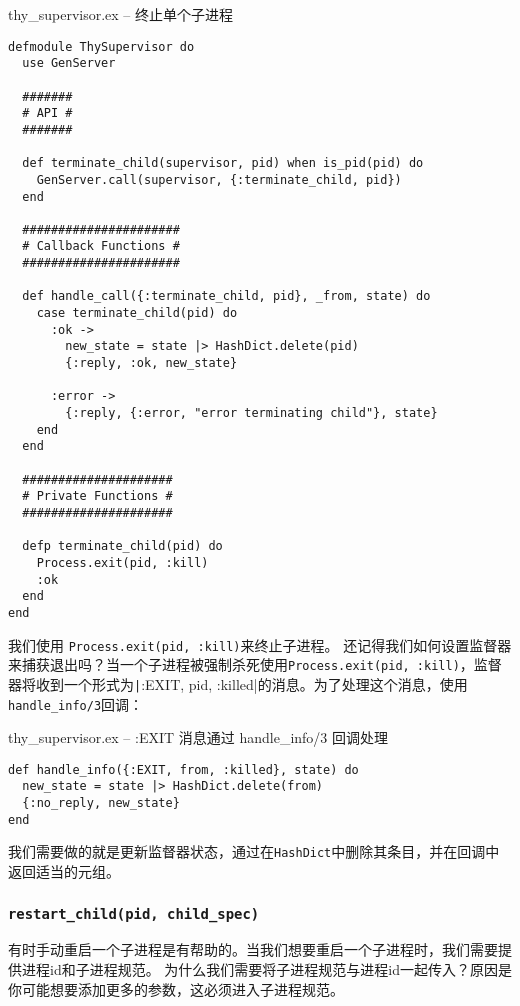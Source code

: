 \begin{code}{ thy\_supervisor.ex -- 终止单个子进程}
\begin{verbatim}
defmodule ThySupervisor do
  use GenServer

  #######
  # API #
  #######

  def terminate_child(supervisor, pid) when is_pid(pid) do
    GenServer.call(supervisor, {:terminate_child, pid})
  end

  ######################
  # Callback Functions #
  ######################

  def handle_call({:terminate_child, pid}, _from, state) do
    case terminate_child(pid) do
      :ok ->
        new_state = state |> HashDict.delete(pid)
        {:reply, :ok, new_state}

      :error ->
        {:reply, {:error, "error terminating child"}, state}
    end
  end

  #####################
  # Private Functions #
  #####################

  defp terminate_child(pid) do
    Process.exit(pid, :kill)
    :ok
  end
end
\end{verbatim}
\label{lst:stop_single_child}
\end{code}

我们使用 \texttt{Process.exit(pid, :kill)}来终止子进程。
还记得我们如何设置监督器来捕获退出吗？当一个子进程被强制杀死使用\texttt{Process.exit(pid, :kill)}，监督器将收到一个形式为\texttt|{:EXIT, pid, :killed}|的消息。为了处理这个消息，使用 \texttt{handle\_info/3}回调：

\begin{code}{thy\_supervisor.ex -- :EXIT 消息通过 handle\_info/3 回调处理}
\begin{verbatim}
def handle_info({:EXIT, from, :killed}, state) do
  new_state = state |> HashDict.delete(from)
  {:no_reply, new_state}
end
\end{verbatim}
\label{lst:handle_exit_message}
\end{code}

我们需要做的就是更新监督器状态，通过在\texttt{HashDict}中删除其条目，并在回调中返回适当的元组。

\subsubsection{\texttt{restart\_child(pid, child\_spec)}}

有时手动重启一个子进程是有帮助的。当我们想要重启一个子进程时，我们需要提供进程id和子进程规范。
为什么我们需要将子进程规范与进程id一起传入？原因是你可能想要添加更多的参数，这必须进入子进程规范。

